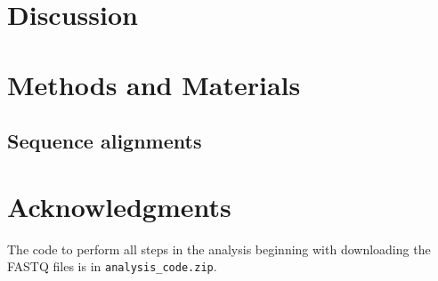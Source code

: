 \documentclass[9pt,lineno]{elife}
\begin{document}
\section{Discussion}


\section{Methods and Materials}

\subsection*{Sequence alignments}

\section{Acknowledgments}



\begin{suppfile}
\caption{
\label{suppfile:code}
The code to perform all steps in the analysis beginning with downloading the FASTQ files is in \texttt{analysis\_code.zip}.}
\end{suppfile}
\end{document}

